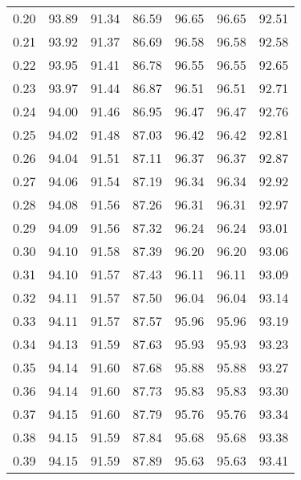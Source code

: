 \begin{tabular}{|c|c|c|c|c|c|c|}
      0.20 &     93.89 &     91.34 &      86.59 &   96.65 &      96.65 &         92.51 \\
      0.21 &     93.92 &     91.37 &      86.69 &   96.58 &      96.58 &         92.58 \\
      0.22 &     93.95 &     91.41 &      86.78 &   96.55 &      96.55 &         92.65 \\
      0.23 &     93.97 &     91.44 &      86.87 &   96.51 &      96.51 &         92.71 \\
      0.24 &     94.00 &     91.46 &      86.95 &   96.47 &      96.47 &         92.76 \\
      0.25 &     94.02 &     91.48 &      87.03 &   96.42 &      96.42 &         92.81 \\
      0.26 &     94.04 &     91.51 &      87.11 &   96.37 &      96.37 &         92.87 \\
      0.27 &     94.06 &     91.54 &      87.19 &   96.34 &      96.34 &         92.92 \\
      0.28 &     94.08 &     91.56 &      87.26 &   96.31 &      96.31 &         92.97 \\
      0.29 &     94.09 &     91.56 &      87.32 &   96.24 &      96.24 &         93.01 \\
      0.30 &     94.10 &     91.58 &      87.39 &   96.20 &      96.20 &         93.06 \\
      0.31 &     94.10 &     91.57 &      87.43 &   96.11 &      96.11 &         93.09 \\
      0.32 &     94.11 &     91.57 &      87.50 &   96.04 &      96.04 &         93.14 \\
      0.33 &     94.11 &     91.57 &      87.57 &   95.96 &      95.96 &         93.19 \\
      0.34 &     94.13 &     91.59 &      87.63 &   95.93 &      95.93 &         93.23 \\
      0.35 &     94.14 &     91.60 &      87.68 &   95.88 &      95.88 &         93.27 \\
      0.36 &     94.14 &     91.60 &      87.73 &   95.83 &      95.83 &         93.30 \\
      0.37 &     94.15 &     91.60 &      87.79 &   95.76 &      95.76 &         93.34 \\
      0.38 &     94.15 &     91.59 &      87.84 &   95.68 &      95.68 &         93.38 \\
      0.39 &     94.15 &     91.59 &      87.89 &   95.63 &      95.63 &         93.41 \\

\end{tabular}
